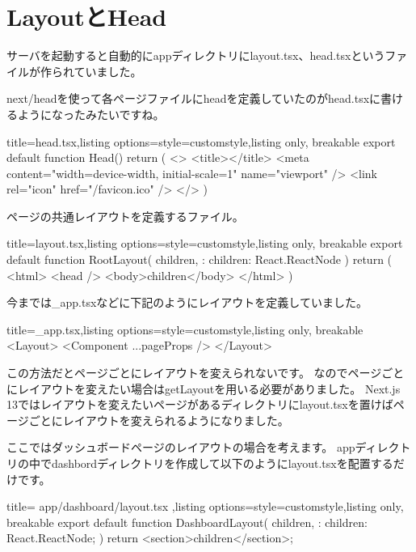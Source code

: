 \section{LayoutとHead}

サーバを起動すると自動的にappディレクトリにlayout.tsx、head.tsxというファイルが作られていました。

next/headを使って各ページファイルにheadを定義していたのがhead.tsxに書けるようになったみたいですね。

\begin{tcblisting}{title={head.tsx},listing options={style=customstyle},listing only, breakable}
  export default function Head() {
      return (
      <>
        <title></title>
        <meta content="width=device-width, initial-scale=1" name="viewport" />
        <link rel="icon" href="/favicon.ico" />
      </>
      )
    }
\end{tcblisting}



ページの共通レイアウトを定義するファイル。




\begin{tcblisting}{title={layout.tsx},listing options={style=customstyle},listing only, breakable}
  export default function RootLayout({
      children,
    }: {
      children: React.ReactNode
  }) {
      return (
        <html>
          <head />
          <body>{children}</body>
        </html>
      )
    }

\end{tcblisting}


今までは\_app.tsxなどに下記のようにレイアウトを定義していました。
\begin{tcblisting}{title={\_app.tsx},listing options={style=customstyle},listing only, breakable}
  <Layout>
    <Component {...pageProps} />
  </Layout>
\end{tcblisting}




この方法だとページごとにレイアウトを変えられないです。
なのでページごとにレイアウトを変えたい場合はgetLayoutを用いる必要がありました。
Next.js 13ではレイアウトを変えたいページがあるディレクトリにlayout.tsxを置けばページごとにレイアウトを変えられるようになりました。


ここではダッシュボードページのレイアウトの場合を考えます。
appディレクトリの中でdashbordディレクトリを作成して以下のようにlayout.tsxを配置するだけです。



\begin{tcblisting}{title={
        app/dashboard/layout.tsx
      },listing options={style=customstyle},listing only, breakable}
  export default function DashboardLayout({
      children,
    }: {
  children: React.ReactNode;
  }) {
      return <section>{children}</section>;
    }

\end{tcblisting}




